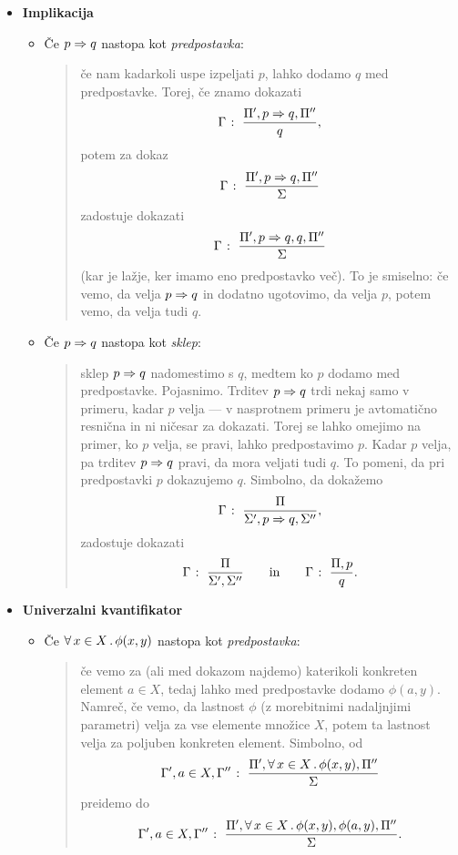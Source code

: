 \begin{itemize}
\begin{itemize}
\begin{quote}
					\end{quote}
			\end{itemize}
		\item\textbf{Implikacija}
			\begin{itemize}
				\item
					Če $p \Rightarrow q$ nastopa kot \emph{predpostavka}:
					\begin{quote}
						če nam kadarkoli uspe izpeljati $p$, lahko dodamo $q$ med predpostavke. Torej, če znamo dokazati
						\[{\Gamma} \;\colon\; \frac{\Pi', p \Rightarrow q, \Pi''}{q},\]
						potem za dokaz
						\[{\Gamma} \;\colon\; \frac{\Pi', p \Rightarrow q, \Pi''}{\Sigma}\]
						zadostuje dokazati
						\[{\Gamma} \;\colon\; \frac{\Pi', p \Rightarrow q, q, \Pi''}{\Sigma}\]
						(kar je lažje, ker imamo eno predpostavko več). To je smiselno: če vemo, da velja $p \Rightarrow q$ in dodatno ugotovimo, da velja $p$, potem vemo, da velja tudi $q$.
					\end{quote}
				\item
					Če $p \Rightarrow q$ nastopa kot \emph{sklep}:
					\begin{quote}
						sklep $p \Rightarrow q$ nadomestimo s $q$, medtem ko $p$ dodamo med predpostavke. Pojasnimo. Trditev $p \Rightarrow q$ trdi nekaj samo v primeru, kadar $p$ velja --- v nasprotnem primeru je avtomatično resnična in ni ničesar za dokazati. Torej se lahko omejimo na primer, ko $p$ velja, se pravi, lahko predpostavimo $p$. Kadar $p$ velja, pa trditev $p \Rightarrow q$ pravi, da mora veljati tudi $q$. To pomeni, da pri predpostavki $p$ dokazujemo $q$. Simbolno, da dokažemo
						\[{\Gamma} \;\colon\; \frac{\Pi}{\Sigma', p \Rightarrow q, \Sigma''},\]
						zadostuje dokazati
						\[{\Gamma} \;\colon\; \frac{\Pi}{\Sigma', \Sigma''} \qquad \text{in} \qquad {\Gamma} \;\colon\; \frac{\Pi, p}{q}.\]
					\end{quote}
			\end{itemize}
		\item\textbf{Univerzalni kvantifikator}
			\begin{itemize}
				\item
					Če $\xall{x}[X]{\phi(x, y)}$ nastopa kot \emph{predpostavka}:
					\begin{quote}
						če vemo za (ali med dokazom najdemo) katerikoli konkreten element $a \in X$, tedaj lahko med predpostavke dodamo $\phi(a, y)$. Namreč, če vemo, da lastnost $\phi$ (z morebitnimi nadaljnjimi parametri) velja za vse elemente množice $X$, potem ta lastnost velja za poljuben konkreten element. Simbolno, od
						\[\claim{\Gamma', a \in X, \Gamma''}{\Pi', \xall{x}[X]{\phi(x, y)}, \Pi''}{\Sigma}\]
						preidemo do
						\[\claim{\Gamma', a \in X, \Gamma''}{\Pi', \xall{x}[X]{\phi(x, y)}, \phi(a, y), \Pi''}{\Sigma}.\]

\end{quote}
\end{itemize}
\end{itemize}
